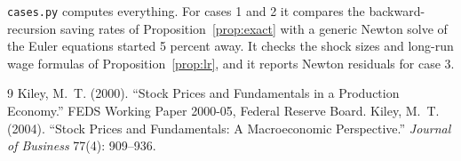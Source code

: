 \documentclass[11pt]{article}
\begin{document}
\texttt{cases.py} computes everything. For cases 1 and 2 it compares the
backward-recursion saving rates of Proposition~\ref{prop:exact} with a generic Newton
solve of the Euler equations started 5 percent away. It checks the shock sizes and long-run
wage formulas of Proposition~\ref{prop:lr}, and it reports Newton residuals for case 3.

\begin{table}[h]\centering\scriptsize
\caption{Verification.}

\end{table}

\begin{thebibliography}{9}
Kiley, M.~T. (2000). ``Stock Prices and Fundamentals in a Production Economy.''
FEDS Working Paper 2000-05, Federal Reserve Board.
Kiley, M.~T. (2004). ``Stock Prices and Fundamentals: A Macroeconomic Perspective.''
\emph{Journal of Business} 77(4): 909--936.
\end{thebibliography}
\end{document}
